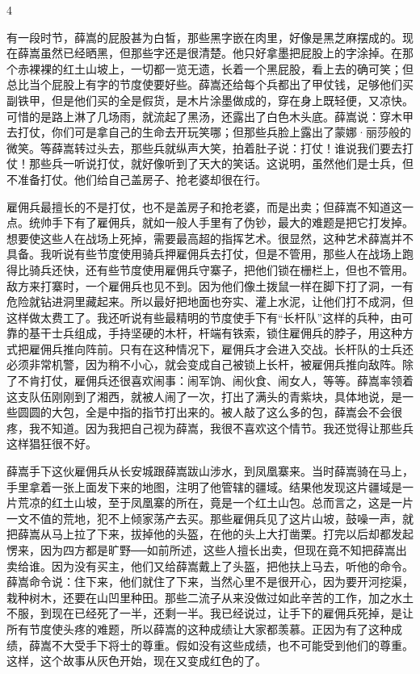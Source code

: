 4 

有一段时节，薛嵩的屁股甚为白皙，那些黑字嵌在肉里，好像是黑芝麻摆成的。现在薛嵩虽然已经晒黑，但那些字还是很清楚。他只好拿墨把屁股上的字涂掉。在那个赤裸裸的红土山坡上，一切都一览无遗，长着一个黑屁股，看上去的确可笑；但总比当个屁股上有字的节度使要好些。薛嵩还给每个兵都出了甲仗钱，足够他们买副铁甲，但是他们买的全是假货，是木片涂墨做成的，穿在身上既轻便，又凉快。可惜的是路上淋了几场雨，就流起了黑汤，还露出了白色木头底。薛嵩说：穿木甲去打仗，你们可是拿自己的生命去开玩笑哪；但那些兵脸上露出了蒙娜·丽莎般的微笑。等薛嵩转过头去，那些兵就纵声大笑，拍着肚子说：打仗！谁说我们要去打仗！那些兵一听说打仗，就好像听到了天大的笑话。这说明，虽然他们是士兵，但不准备打仗。他们给自己盖房子、抢老婆却很在行。 

雇佣兵最擅长的不是打仗，也不是盖房子和抢老婆，而是出卖；但薛嵩不知道这一点。统帅手下有了雇佣兵，就如一般人手里有了伪钞，最大的难题是把它打发掉。想要使这些人在战场上死掉，需要最高超的指挥艺术。很显然，这种艺术薛嵩并不具备。我听说有些节度使用骑兵押雇佣兵去打仗，但是不管用，那些人在战场上跑得比骑兵还快，还有些节度使用雇佣兵守寨子，把他们锁在栅栏上，但也不管用。敌方来打寨时，一个雇佣兵也见不到。因为他们像土拨鼠一样在脚下打了洞，一有危险就钻进洞里藏起来。所以最好把地面也夯实、灌上水泥，让他们打不成洞，但这样做太费工了。我还听说有些最精明的节度使手下有“长杆队”这样的兵种，由可靠的基干士兵组成，手持坚硬的木杆，杆端有铁索，锁住雇佣兵的脖子，用这种方式把雇佣兵推向阵前。只有在这种情况下，雇佣兵才会进入交战。长杆队的士兵还必须非常机警，因为稍不小心，就会变成自己被锁上长杆，被雇佣兵推向敌阵。除了不肯打仗，雇佣兵还很喜欢闹事：闹军饷、闹伙食、闹女人，等等。薛嵩率领着这支队伍刚刚到了湘西，就被人闹了一次，打出了满头的青紫块，具体地说，是一些圆圆的大包，全是中指的指节打出来的。被人敲了这么多的包，薛嵩会不会很疼，我不知道。因为我把自己视为薛嵩，我很不喜欢这个情节。我还觉得让那些兵这样猖狂很不好。 

薛嵩手下这伙雇佣兵从长安城跟薛嵩跋山涉水，到凤凰寨来。当时薛嵩骑在马上，手里拿着一张上面发下来的地图，注明了他管辖的疆域。结果他发现这片疆域是一片荒凉的红土山坡，至于凤凰寨的所在，竟是一个红土山包。总而言之，这是一片一文不值的荒地，犯不上倾家荡产去买。那些雇佣兵见了这片山坡，鼓噪一声，就把薛嵩从马上拉了下来，拔掉他的头盔，在他的头上大打凿栗。打完以后却都发起愣来，因为四方都是旷野──如前所述，这些人擅长出卖，但现在竟不知把薛嵩出卖给谁。因为没有买主，他们又给薛嵩戴上了头盔，把他扶上马去，听他的命令。薛嵩命令说：住下来，他们就住了下来，当然心里不是很开心，因为要开河挖渠，栽种树木，还要在山凹里种田。那些二流子从来没做过如此辛苦的工作，加之水土不服，到现在已经死了一半，还剩一半。我已经说过，让手下的雇佣兵死掉，是让所有节度使头疼的难题，所以薛嵩的这种成绩让大家都羡慕。正因为有了这种成绩，薛嵩不大受手下将士的尊重。假如没有这些成绩，也不可能受到他们的尊重。这样，这个故事从灰色开始，现在又变成红色的了。 

